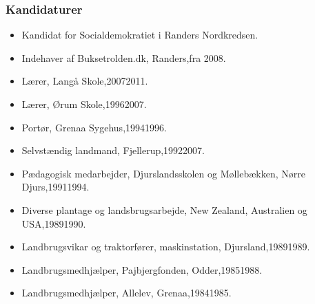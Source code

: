 \documentclass[11pt, a4paper]{awesome-cv}
\begin{document}
\begin{cvletter}
\subsubsection*{Kandidaturer}
\begin{itemize}
\item Kandidat for Socialdemokratiet i Randers Nordkredsen.
\end{itemize}
\begin{itemize}
\item Indehaver af Buksetrolden.dk, Randers,fra 2008.
\item Lærer, Langå Skole,20072011.
\item Lærer, Ørum Skole,19962007.
\item Portør, Grenaa Sygehus,19941996.
\item Selvstændig landmand, Fjellerup,19922007.
\item Pædagogisk medarbejder, Djurslandsskolen og Møllebækken, Nørre Djurs,19911994.
\item Diverse plantage og landsbrugsarbejde, New Zealand, Australien og USA,19891990.
\item Landbrugsvikar og traktorfører, maskinstation, Djursland,19891989.
\item Landbrugsmedhjælper, Pajbjergfonden, Odder,19851988.
\item Landbrugsmedhjælper, Allelev, Grenaa,19841985.
\end{itemize}
\end{cvletter}
\end{document}
